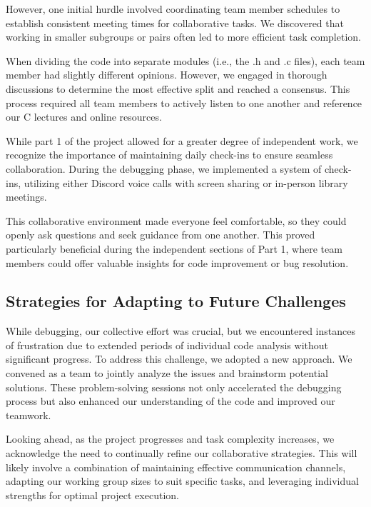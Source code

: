 \documentclass[9pt,a4paper,twoside]{tau-class/tau}
\begin{document}
        However, one initial hurdle involved coordinating team member schedules to establish consistent meeting times for collaborative tasks.  We discovered that working in smaller subgroups or pairs often led to more efficient task completion.

        When dividing the code into separate modules (i.e., the .h and .c files), each team member had slightly different opinions. However, we engaged in thorough discussions to determine the most effective split and reached a consensus. This process required all team members to actively listen to one another and reference our C lectures and online resources. 
    
        While part 1 of the project allowed for a greater degree of independent work, we recognize the importance of maintaining daily check-ins to ensure seamless collaboration.  During the debugging phase, we implemented a system of check-ins, utilizing either Discord voice calls with screen sharing or in-person library meetings.  
        
        This collaborative environment made everyone feel comfortable, so they could openly ask questions and seek guidance from one another.  This proved particularly beneficial during the independent sections of Part 1, where team members could offer valuable insights for code improvement or bug resolution.

    \subsection{Strategies for Adapting to Future Challenges}
        While debugging, our collective effort was crucial, but we encountered instances of frustration due to extended periods of individual code analysis without significant progress.  To address this challenge, we adopted a new approach.  We convened as a team to jointly analyze the issues and brainstorm potential solutions. These problem-solving sessions not only accelerated the debugging process but also enhanced our understanding of the code and improved our teamwork.
        
        Looking ahead, as the project progresses and task complexity increases, we acknowledge the need to continually refine our collaborative strategies.  This will likely involve a combination of maintaining effective communication channels, adapting our working group sizes to suit specific tasks, and leveraging individual strengths for optimal project execution.
\end{document}
